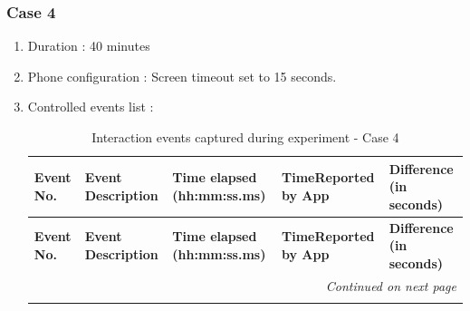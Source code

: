 \documentclass{article}
\begin{document}
\subsubsection{Case 4}
\label{sec: UsageMetricAccuracyTestingCase4}
\begin{enumerate}
    \item Duration : 40 minutes
    \item Phone configuration : Screen timeout set to 15 seconds.
    \item Controlled events list : 
    
    \begin{longtable}{p{1.6cm} p{6.4cm} p{3.0cm} p{2.6cm} p{2.2cm}}
        \caption{Interaction events captured during experiment - Case 4}
        \label{tab:Interaction events captured during experiment - Case 4} \\

        \toprule
        \textbf{Event No.} & \textbf{Event Description} & \textbf{Time elapsed (hh:mm:ss.ms)} & \textbf{TimeReported by App} & \textbf{Difference (in seconds)} \\
        \midrule
        \endfirsthead

        \toprule
        \textbf{Event No.} & \textbf{Event Description} & \textbf{Time elapsed (hh:mm:ss.ms)} & \textbf{TimeReported by App} & \textbf{Difference (in seconds)} \\
        \midrule
        \endhead

        \midrule
        \multicolumn{5}{r}{\textit{Continued on next page}}
        \\
        \endfoot

        \bottomrule
        \endlastfoot


\end{longtable}
\end{enumerate}
\end{document}
